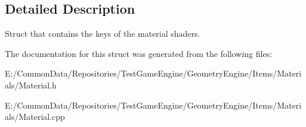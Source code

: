 \subsection{Detailed Description}
Struct that contains the keys of the material shaders. 

The documentation for this struct was generated from the following files\+:\begin{DoxyCompactItemize}
\item 
E\+:/\+Common\+Data/\+Repositories/\+Test\+Game\+Engine/\+Geometry\+Engine/\+Items/\+Materials/Material.\+h\item 
E\+:/\+Common\+Data/\+Repositories/\+Test\+Game\+Engine/\+Geometry\+Engine/\+Items/\+Materials/Material.\+cpp\end{DoxyCompactItemize}
